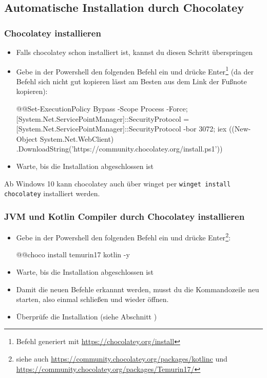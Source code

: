 \subsection*{Automatische Installation durch Chocolatey}
\subsubsection*{Chocolatey installieren}
\begin{itemize}
    \item Falls chocolatey schon installiert ist, kannst du diesen Schritt überspringen
    \item Gebe in der Powershell den folgenden Befehl ein und drücke Enter\footnote{Befehl generiert mit \url{https://chocolatey.org/install}} (da der Befehl sich nicht gut kopieren lässt am Besten aus dem Link der Fußnote kopieren):
        \begin{commandshell}
            @\shellprefix{}@Set-ExecutionPolicy Bypass -Scope Process -Force;
            [System.Net.ServicePointManager]::SecurityProtocol =
            [System.Net.ServicePointManager]::SecurityProtocol -bor 3072;
            iex ((New-Object System.Net.WebClient)
            .DownloadString('https://community.chocolatey.org/install.ps1'))
        \end{commandshell}
    \item Warte, bis die Installation abgeschlossen ist
\end{itemize}
\begin{hinweis}
    Ab Windows 10 kann chocolatey auch über winget per \texttt{winget install chocolatey} installiert werden.
\end{hinweis}
\clearpage
\subsubsection*{JVM und Kotlin Compiler durch Chocolatey installieren}
\begin{itemize}
    \item Gebe in der Powershell den folgenden Befehl ein und drücke Enter\footnote{siehe auch \url{https://community.chocolatey.org/packages/kotlinc} und \url{https://community.chocolatey.org/packages/Temurin17/}}:
        \begin{commandshell}
            @\shellprefix{}@choco install temurin17 kotlin -y
        \end{commandshell}
    \item Warte, bis die Installation abgeschlossen ist
    \item Damit die neuen Befehle erkannnt werden, musst du die Kommandozeile neu starten, also einmal schließen und wieder öffnen.
    \item Überprüfe die Installation (siehe Abschnitt )
\end{itemize}
